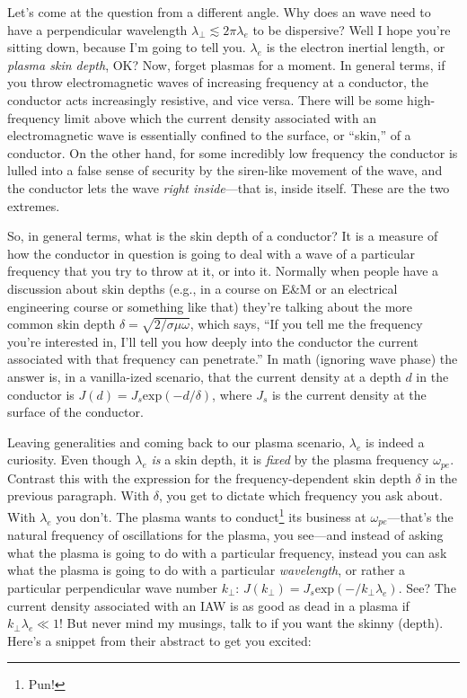 Let's come at the question from a different angle. Why does an \Alf wave need to
have a perpendicular wavelength $\lambda_\perp \lesssim 2 \pi \lambda_e$ to be
dispersive? Well I hope you're sitting down, because I'm going to tell
you. $\lambda_e$ is the electron inertial length, or \emph{plasma skin depth},
OK? Now, forget plasmas for a moment. In general terms, if you throw
electromagnetic waves of increasing frequency at a conductor, the conductor acts
increasingly resistive, and vice versa. There will be some high-frequency limit
above which the current density associated with an electromagnetic wave is
essentially confined to the surface, or ``skin,'' of a conductor. On the other
hand, for some incredibly low frequency the conductor is lulled into a false
sense of security by the siren-like movement of the wave, and the conductor lets
the wave \emph{right inside}---that is, inside itself. These are the two
extremes.

So, in general terms, what is the skin depth of a conductor? It is a measure of
how the conductor in question is going to deal with a wave of a particular
frequency that you try to throw at it, or into it. Normally when people have a
discussion about skin depths (e.g., in a course on E\&M or an electrical
engineering course or something like that) they're talking about the more common
skin depth $\delta = \sqrt{2 / \sigma \mu \omega}$, which says, ``If you tell me
the frequency you're interested in, I'll tell you how deeply into the conductor
the current associated with that frequency can penetrate.'' In math (ignoring
wave phase) the answer is, in a vanilla-ized scenario, that the current density
at a depth $d$ in the conductor is $J (d) = J_s \mathrm{exp} ( - d / \delta )$,
where $J_s$ is the current density at the surface of the conductor.

Leaving generalities and coming back to our plasma scenario, $\lambda_e$ is
indeed a curiosity. Even though $\lambda_e$ \emph{is} a skin depth, it is
\emph{fixed} by the plasma frequency $\omega_{pe}$. Contrast this with the
expression for the frequency-dependent skin depth $\delta$ in the previous
paragraph. With $\delta$, you get to dictate which frequency you ask about. With
$\lambda_e$ you don't. The plasma wants to conduct\footnote{Pun!} its business
at $\omega_{pe}$---that's the natural frequency of oscillations for the plasma,
you see---and instead of asking what the plasma is going to do with a particular
frequency, instead you can ask what the plasma is going to do with a particular
\emph{wavelength}, or rather a particular perpendicular wave number $k_\perp$:
$J ( k_\perp ) = J_s \mathrm{exp} ( - / k_\perp \lambda_e )$.  See? The current
density associated with an IAW is as good as dead in a plasma if $k_\perp
\lambda_e \ll 1$! But never mind my musings, talk to \citet{Morales1994} if you
want the skinny (depth). Here's a snippet from their abstract to get you
excited:

